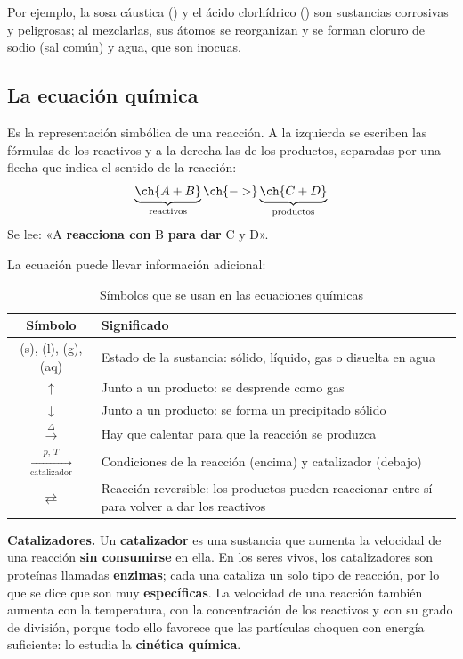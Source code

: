Por ejemplo, la sosa cáustica () y el ácido clorhídrico () son sustancias corrosivas y peligrosas; al mezclarlas,
sus átomos se reorganizan y se forman cloruro de sodio (sal común) y agua, que son inocuas.

\subsection{La ecuación química}

\begin{definition}
    Es la representación simbólica de una reacción. A la izquierda se escriben las fórmulas de los reactivos y a la derecha las de
    los productos, separadas por una flecha que indica el sentido de la reacción:
    \[ \underbrace{\ch{A + B}}_{\text{reactivos}} \ch{->} \underbrace{\ch{C + D}}_{\text{productos}} \]
    Se lee: «A \textbf{reacciona con} B \textbf{para dar} C y D».
\end{definition}

La ecuación puede llevar información adicional:

\begin{table}[H]
    \centering
    \caption{Símbolos que se usan en las ecuaciones químicas}
    \vspace{-5pt}
    \begin{tabular}{@{}cL{10cm}@{}}
        \toprule
        \textbf{Símbolo} & \textbf{Significado} \\
        \midrule
        (s), (l), (g), (aq) & Estado de la sustancia: sólido, líquido, gas o disuelta en agua \\[3pt]
        \(\uparrow\) & Junto a un producto: se desprende como gas \\[3pt]
        \(\downarrow\) & Junto a un producto: se forma un precipitado sólido \\[3pt]
        \(\xrightarrow{\Delta}\) & Hay que calentar para que la reacción se produzca \\[3pt]
        \(\xrightarrow[\text{catalizador}]{p,\ T}\) & Condiciones de la reacción (encima) y catalizador (debajo) \\[3pt]
        \(\rightleftarrows\) & Reacción reversible: los productos pueden reaccionar entre sí para volver a dar los reactivos \\
        \bottomrule
    \end{tabular}
    \label{tab:ud6-simbolos}
\end{table}

\begin{remark}
    \textbf{Catalizadores.} Un \textbf{catalizador} es una sustancia que aumenta la velocidad de una reacción \textbf{sin
    consumirse} en ella. En los seres vivos, los catalizadores son proteínas llamadas \textbf{enzimas}; cada una cataliza un solo
    tipo de reacción, por lo que se dice que son muy \textbf{específicas}. La velocidad de una reacción también aumenta con la
    temperatura, con la concentración de los reactivos y con su grado de división, porque todo ello favorece que las partículas
    choquen con energía suficiente: lo estudia la \textbf{cinética química}.
\end{remark}

